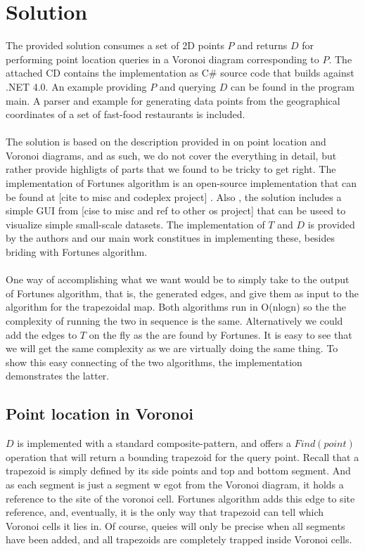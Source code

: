 \section{Solution}
The provided solution consumes a set of 2D points  $P$ and returns  $D$ for performing point location queries in a Voronoi diagram corresponding to $P$. The attached CD contains the implementation as C\# source code that builds against .NET 4.0. An example providing $P$ and querying $D$ can be found in the program main.  A parser and example for generating data points from  the geographical coordinates of a set of fast-food restaurants is included. 
\paragraph{}
The solution is based on the description provided in \cite{computational_geometry} on point location and Voronoi diagrams, and as such, we do not cover the everything in detail, but rather provide highligts of parts that we found to be tricky to get right.  The implementation of Fortunes algorithm is an open-source implementation that can be found at [cite to misc and codeplex project] . Also , the solution includes a simple GUI from [cise to misc and ref to other os project] that can be useed to visualize simple small-scale datasets.  The implementation of $T$ and $D$ is provided by the authors and our main work constitues in implementing these, besides briding with Fortunes algorithm.
\paragraph{}
One way of accomplishing what we want would be to simply take to the output of Fortunes algorithm, that is, the generated edges, and give them as input to the algorithm for the trapezoidal map. Both algorithms run in O(nlogn)  so the the complexity of running the two in sequence is the same. Alternatively we could add the edges to $T$ on the fly as the are found by Fortunes. It is easy to see that we will get the same complexity as we are virtually doing the same thing. To show this easy connecting of the two algorithms, the implementation demonstrates the latter.

\subsection{Point location in Voronoi}
$D$ is implemented with a standard composite-pattern, and offers a $Find(point)$ operation that will return a bounding trapezoid for the query point.  Recall that a trapezoid is simply defined by its side points and top and bottom segment. And as each segment is just a segment w egot from the Voronoi diagram, it holds a reference to the site of the voronoi cell. Fortunes algorithm adds this edge to site reference, and, eventually, it is the only way that trapezoid can tell which Voronoi cells it lies in. Of course, queies will only be precise when all segments have been added, and all trapezoids are completely trapped inside Voronoi cells.
